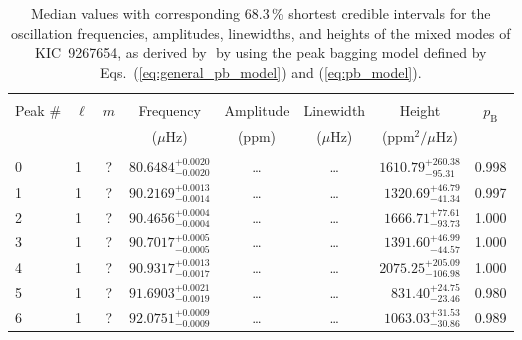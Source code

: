 \begin{table*}[!]
\caption{Median values with corresponding 68.3\,\% shortest credible intervals for the oscillation frequencies, amplitudes, linewidths, and heights of the mixed modes of KIC~9267654, as derived by \diamonds\,\,by using the peak bagging model defined by Eqs.~(\ref{eq:general_pb_model}) and (\ref{eq:pb_model}).}
\label{tab:9267654m}
\centering
\begin{tabular}{llcrrlrc}
\hline\hline
\\[-8pt]      
Peak \# & $\ell$ & $m$ & \multicolumn{1}{c}{Frequency} & \multicolumn{1}{c}{Amplitude} & \multicolumn{1}{c}{Linewidth} & \multicolumn{1}{c}{Height}& $p_\mathrm{B}$\\
 & & & \multicolumn{1}{c}{($\mu$Hz)} & \multicolumn{1}{c}{(ppm)} & \multicolumn{1}{c}{($\mu$Hz)} & \multicolumn{1}{c}{(ppm$^2/\mu$Hz)}\\
\hline \\[-8pt]
0 & 1 & ? & $     80.6484_{-      0.0020}^{+      0.0020}$ & \multicolumn{1}{c}{\dots} & \multicolumn{1}{c}{\dots} & $     1610.79_{-       95.31}^{+      260.38}$ & 0.998\\[1pt]
 
1 & 1 & ? & $     90.2169_{-      0.0014}^{+      0.0013}$ & \multicolumn{1}{c}{\dots} & \multicolumn{1}{c}{\dots} & $     1320.69_{-       41.34}^{+       46.79}$ & 0.997\\[1pt]
2 & 1 & ? & $     90.4656_{-      0.0004}^{+      0.0004}$ & \multicolumn{1}{c}{\dots} & \multicolumn{1}{c}{\dots} & $     1666.71_{-       93.73}^{+       77.61}$ & 1.000\\[1pt]
3 & 1 & ? & $     90.7017_{-      0.0005}^{+      0.0005}$ & \multicolumn{1}{c}{\dots} & \multicolumn{1}{c}{\dots} & $     1391.60_{-       44.57}^{+       46.99}$ & 1.000\\[1pt]
4 & 1 & ? & $     90.9317_{-      0.0017}^{+      0.0013}$ & \multicolumn{1}{c}{\dots} & \multicolumn{1}{c}{\dots} & $     2075.25_{-      106.98}^{+      205.09}$ & 1.000\\[1pt]
5 & 1 & ? & $     91.6903_{-      0.0019}^{+      0.0021}$ & \multicolumn{1}{c}{\dots} & \multicolumn{1}{c}{\dots} & $      831.40_{-       23.46}^{+       24.75}$ & 0.980\\[1pt]
6 & 1 & ? & $     92.0751_{-      0.0009}^{+      0.0009}$ & \multicolumn{1}{c}{\dots} & \multicolumn{1}{c}{\dots} & $     1063.03_{-       30.86}^{+       31.53}$ & 0.989\\[1pt]


\end{tabular}
\end{table*}
